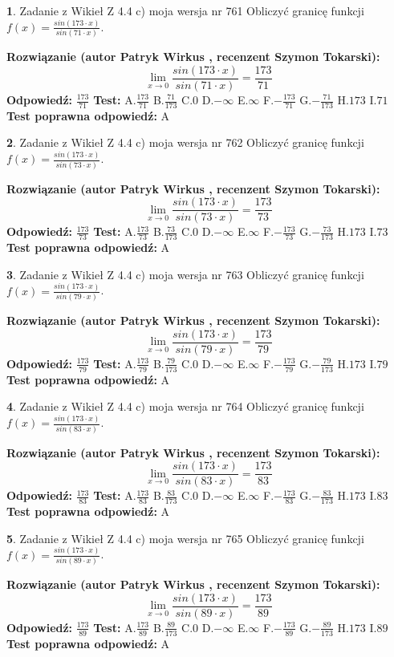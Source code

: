 \documentclass[12pt, a4paper]{article}
\theoremstyle{definition} %
\newtheorem{zad}{}
\newcommand{\zadStart}[1]{\begin{zad}#1\newline}
\newcommand{\zadStop}{\end{zad}}
\newcommand{\rozwStart}[2]{\noindent \textbf{Rozwiązanie (autor #1 , recenzent #2): }\newline}
\newcommand{\rozwStop}{\newline}
\newcommand{\odpStart}{\noindent \textbf{Odpowiedź:}\newline}
\newcommand{\odpStop}{\newline}
\newcommand{\testStart}{\noindent \textbf{Test:}\newline}
\newcommand{\testStop}{\newline}
\newcommand{\kluczStart}{\noindent \textbf{Test poprawna odpowiedź:}\newline}
\newcommand{\kluczStop}{\newline}
\begin{document}
\zadStart{Zadanie z Wikieł Z 4.4 c) moja wersja nr 761}
Obliczyć granicę funkcji $f(x)=\frac{sin(173\cdot x)}{sin(71\cdot x)}$.
\zadStop
\rozwStart{Patryk Wirkus}{Szymon Tokarski}
$$\lim\limits_{x\to 0}\frac{sin(173\cdot x)}{sin(71\cdot x)}=
\frac{173}{71}$$
\rozwStop
\odpStart
$\frac{173}{71}$
\odpStop
\testStart
A.$\frac{173}{71}$
B.$\frac{71}{173}$
C.$0$
D.$-\infty$
E.$\infty$
F.$-\frac{173}{71}$
G.$-\frac{71}{173}$
H.$173$
I.$71$
\testStop
\kluczStart
A
\kluczStop



\zadStart{Zadanie z Wikieł Z 4.4 c) moja wersja nr 762}
Obliczyć granicę funkcji $f(x)=\frac{sin(173\cdot x)}{sin(73\cdot x)}$.
\zadStop
\rozwStart{Patryk Wirkus}{Szymon Tokarski}
$$\lim\limits_{x\to 0}\frac{sin(173\cdot x)}{sin(73\cdot x)}=
\frac{173}{73}$$
\rozwStop
\odpStart
$\frac{173}{73}$
\odpStop
\testStart
A.$\frac{173}{73}$
B.$\frac{73}{173}$
C.$0$
D.$-\infty$
E.$\infty$
F.$-\frac{173}{73}$
G.$-\frac{73}{173}$
H.$173$
I.$73$
\testStop
\kluczStart
A
\kluczStop



\zadStart{Zadanie z Wikieł Z 4.4 c) moja wersja nr 763}
Obliczyć granicę funkcji $f(x)=\frac{sin(173\cdot x)}{sin(79\cdot x)}$.
\zadStop
\rozwStart{Patryk Wirkus}{Szymon Tokarski}
$$\lim\limits_{x\to 0}\frac{sin(173\cdot x)}{sin(79\cdot x)}=
\frac{173}{79}$$
\rozwStop
\odpStart
$\frac{173}{79}$
\odpStop
\testStart
A.$\frac{173}{79}$
B.$\frac{79}{173}$
C.$0$
D.$-\infty$
E.$\infty$
F.$-\frac{173}{79}$
G.$-\frac{79}{173}$
H.$173$
I.$79$
\testStop
\kluczStart
A
\kluczStop



\zadStart{Zadanie z Wikieł Z 4.4 c) moja wersja nr 764}
Obliczyć granicę funkcji $f(x)=\frac{sin(173\cdot x)}{sin(83\cdot x)}$.
\zadStop
\rozwStart{Patryk Wirkus}{Szymon Tokarski}
$$\lim\limits_{x\to 0}\frac{sin(173\cdot x)}{sin(83\cdot x)}=
\frac{173}{83}$$
\rozwStop
\odpStart
$\frac{173}{83}$
\odpStop
\testStart
A.$\frac{173}{83}$
B.$\frac{83}{173}$
C.$0$
D.$-\infty$
E.$\infty$
F.$-\frac{173}{83}$
G.$-\frac{83}{173}$
H.$173$
I.$83$
\testStop
\kluczStart
A
\kluczStop



\zadStart{Zadanie z Wikieł Z 4.4 c) moja wersja nr 765}
Obliczyć granicę funkcji $f(x)=\frac{sin(173\cdot x)}{sin(89\cdot x)}$.
\zadStop
\rozwStart{Patryk Wirkus}{Szymon Tokarski}
$$\lim\limits_{x\to 0}\frac{sin(173\cdot x)}{sin(89\cdot x)}=
\frac{173}{89}$$
\rozwStop
\odpStart
$\frac{173}{89}$
\odpStop
\testStart
A.$\frac{173}{89}$
B.$\frac{89}{173}$
C.$0$
D.$-\infty$
E.$\infty$
F.$-\frac{173}{89}$
G.$-\frac{89}{173}$
H.$173$
I.$89$
\testStop
\kluczStart
A
\kluczStop
\end{document}
